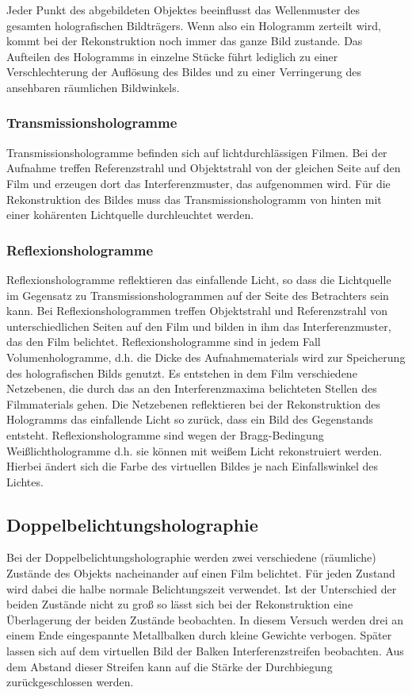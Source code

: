 \documentclass[12pt]{article}
\begin{document}
Jeder Punkt des abgebildeten Objektes beeinflusst das Wellenmuster des gesamten holografischen Bildträgers. Wenn also ein Hologramm zerteilt wird, kommt bei
der Rekonstruktion noch immer das ganze Bild zustande. Das Aufteilen des Hologramms in einzelne Stücke führt lediglich zu einer Verschlechterung der
Auflösung des Bildes und zu einer Verringerung des ansehbaren räumlichen Bildwinkels.

\subsubsection{Transmissionshologramme}
Transmissionshologramme befinden sich auf lichtdurchlässigen Filmen. Bei der Aufnahme treffen Referenzstrahl und Objektstrahl von der gleichen Seite auf
den Film und erzeugen dort das Interferenzmuster, das aufgenommen wird.
Für die Rekonstruktion des Bildes muss das Transmissionshologramm von hinten mit einer kohärenten Lichtquelle durchleuchtet werden.

\subsubsection{Reflexionshologramme}
Reflexionshologramme reflektieren das einfallende Licht, so dass die Lichtquelle im Gegensatz zu Transmissionshologrammen auf der Seite des Betrachters sein
kann. Bei Reflexionshologrammen treffen Objektstrahl und Referenzstrahl von unterschiedlichen Seiten auf den Film und bilden in ihm das Interferenzmuster, das 
den Film belichtet. Reflexionshologramme sind in jedem Fall Volumenhologramme, d.h. die Dicke des Aufnahmematerials wird zur Speicherung des holografischen 
Bilds genutzt. Es entstehen in dem Film verschiedene Netzebenen, die durch das an den Interferenzmaxima belichteten Stellen des Filmmaterials gehen. Die 
Netzebenen reflektieren bei der Rekonstruktion des Hologramms das einfallende Licht so zurück, dass ein Bild des Gegenstands entsteht. Reflexionshologramme 
sind wegen der Bragg-Bedingung Weißlichthologramme d.h. sie können mit weißem Licht rekonstruiert werden. Hierbei ändert sich die Farbe des virtuellen Bildes
je nach Einfallswinkel des Lichtes.

\subsection{Doppelbelichtungsholographie}
Bei der Doppelbelichtungsholographie werden zwei verschiedene (räumliche) Zustände des Objekts nacheinander auf einen Film belichtet. Für jeden Zustand wird
dabei die halbe normale Belichtungszeit verwendet. Ist der Unterschied der beiden Zustände nicht zu groß so lässt sich bei der Rekonstruktion eine Überlagerung der
beiden Zustände beobachten. In diesem Versuch werden drei an einem Ende eingespannte Metallbalken durch kleine Gewichte verbogen. Später lassen sich auf dem
virtuellen Bild der Balken Interferenzstreifen beobachten. Aus dem Abstand dieser Streifen kann auf die Stärke der Durchbiegung zurückgeschlossen werden.
\end{document}
